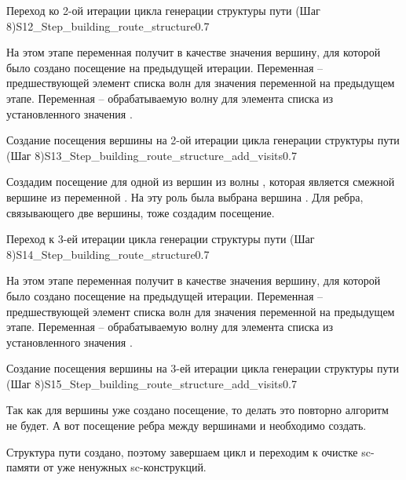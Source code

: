\begin{itemize}
\begin{algostep}{Переход ко 2-ой итерации цикла генерации структуры
    пути (Шаг 8)}{S12_Step_building_route_structure}{0.7}
 
  На этом этапе переменная  получит в качестве
  значения вершину, для которой было создано посещение на предыдущей
  итерации. Переменная  – предшествующей элемент
  списка волн для значения переменной  на предыдущем
  этапе. Переменная  – обрабатываемую волну для
  элемента списка из установленного значения .
\end{algostep}


\begin{algostep}{Создание посещения вершины на 2-ой итерации цикла
    генерации структуры пути (Шаг
    8)}{S13_Step_building_route_structure_add_visits}{0.7}

  Создадим посещение для одной из вершин из волны ,
  которая является смежной вершине из переменной
  . На эту роль была выбрана вершина . Для
  ребра, связывающего две вершины, тоже создадим посещение.
\end{algostep}


\begin{algostep}{Переход к 3-ей итерации цикла генерации структуры пути
    (Шаг 8)}{S14_Step_building_route_structure}{0.7}
 
  На этом этапе переменная  получит в качестве
  значения вершину, для которой было создано посещение на предыдущей
  итерации. Переменная  – предшествующей элемент
  списка волн для значения переменной  на предыдущем
  этапе. Переменная  – обрабатываемую волну для
  элемента списка из установленного значения .
\end{algostep}


\begin{algostep}{Создание посещения вершины на 3-ей итерации цикла
    генерации структуры пути (Шаг
    8)}{S15_Step_building_route_structure_add_visits}{0.7}
 
  Так как для вершины  уже создано посещение, то делать это
  повторно алгоритм не будет. А вот посещение ребра между вершинами
   и  необходимо создать.

  Структура пути создано, поэтому завершаем цикл и переходим к очистке
  sc-памяти от уже ненужных sc-конструкций.
\end{algostep}


\end{itemize}
